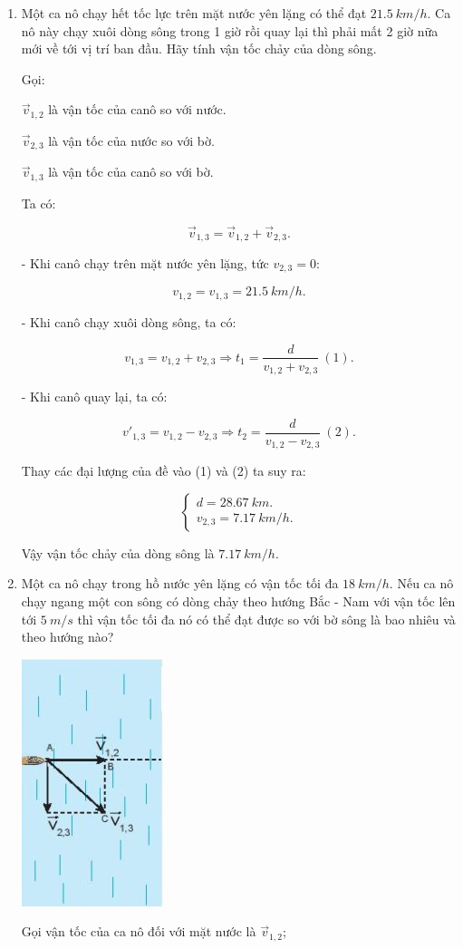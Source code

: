 \begin{enumerate}[label=\bfseries Câu \arabic*:]
{	
	}
	\item {}
	
	\cauhoi
	{
		Một ca nô chạy hết tốc lực trên mặt nước yên lặng có thể đạt $\SI{21,5}{km/h}$. Ca nô này chạy xuôi dòng sông trong 1 giờ rồi quay lại thì phải mất 2 giờ nữa mới về tới vị trí ban đầu. Hãy tính vận tốc chảy của dòng sông.
	}
	\loigiai
	{
		Gọi:
		
		$\vec v_{1,2}$ là vận tốc của canô so với nước.
	
		
		$\vec v_{2,3}$ là vận tốc của nước so với bờ.
		
		
		$\vec v_{1,3}$ là vận tốc của canô so với bờ.
		
		Ta có:
		
		$$\vec v_{1,3} = \vec v_{1,2} + \vec v_{2,3}.$$
		
		- Khi canô chạy trên mặt nước yên lặng, tức $v_{2,3} = 0$:
		
		
		$$v_{1,2} = v_{1,3} = \SI{21,5}{km/h}.$$
		
		- Khi canô chạy xuôi dòng sông, ta có:
		
		$$v_{1,3} = v_{1,2} + v_{2,3} \Rightarrow t_1 = \dfrac{d}{v_{1,2} + v_{2,3}}\ (1).$$
		
		- Khi canô quay lại, ta có:
		
		$$v'_{1,3} = v_{1,2} - v_{2,3} \Rightarrow t_2 = \dfrac{d}{v_{1,2} - v_{2,3}}\ (2).$$
	
		Thay các đại lượng của đề vào (1) và (2) ta suy ra:
		
		$$\begin{cases}
			d = \SI{28,67}{km}.\\
			v_{2,3} = \SI{7,17}{km/h}.
		\end{cases}$$
	
		Vậy vận tốc chảy của dòng sông là $\SI{7,17}{km/h}$.
		
		
	}
	\item {}
	
	\cauhoi
	{
		Một ca nô chạy trong hồ nước yên lặng có vận tốc tối đa $\SI{18}{km/h}$. Nếu ca nô chạy ngang một con sông có dòng chảy theo hướng Bắc - Nam với vận tốc lên tới $\SI{5}{m/s}$ thì vận tốc tối đa nó có thể đạt được so với bờ sông là bao nhiêu và theo hướng nào?
	}
	\loigiai
	{
		\begin{center}
			\includegraphics[scale=1]{../figs/VN10-2022-PH-TP005-4.jpg}
		\end{center}
		Gọi vận tốc của ca nô đối với mặt nước là $\vec v_{1,2}$; 
		
}
\end{enumerate}
